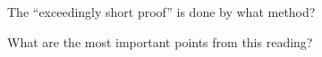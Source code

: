\documentclass[nooutcomes]{ximera}
\begin{document}
\begin{question}
The ``exceedingly short proof'' is done by what method?
\begin{multipleChoice}
\end{multipleChoice}
\end{question}


\begin{question}
What are the most important points from this reading?
\begin{freeResponse}
\end{freeResponse}

\end{question}
\end{document}
